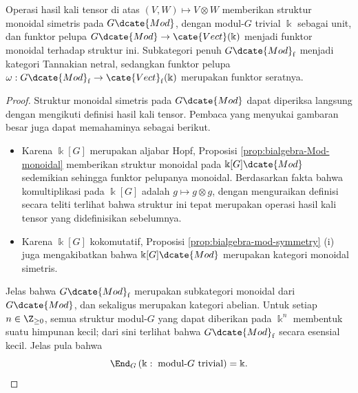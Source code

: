 \begin{proposition}\label{prop:RepG-Tannakian}
	Operasi hasil kali tensor di atas $(V, W) \mapsto V \otimes W$ memberikan struktur monoidal simetris pada $G\dcate{Mod}$, dengan modul-$G$ trivial $\Bbbk$ sebagai unit, dan funktor pelupa $G\dcate{Mod} \to \cate{Vect}(\Bbbk)$ menjadi funktor monoidal terhadap struktur ini. Subkategori penuh $G\dcate{Mod}_{\mathrm{f}}$ menjadi kategori Tannakian netral, sedangkan funktor pelupa $\omega: G\dcate{Mod}_{\mathrm{f}} \to \cate{Vect}_{\mathrm{f}}(\Bbbk)$ merupakan funktor seratnya.
\end{proposition}
\begin{proof}
	Struktur monoidal simetris pada $G\dcate{Mod}$ dapat diperiksa langsung
	dengan mengikuti definisi hasil kali tensor. Pembaca yang menyukai gambaran
	besar juga dapat memahaminya sebagai berikut.
	\begin{itemize}
		\item Karena $\Bbbk[G]$ merupakan aljabar Hopf, Proposisi \ref{prop:bialgebra-Mod-monoidal} memberikan struktur monoidal pada $\Bbbk[G]\dcate{Mod}$ sedemikian sehingga funktor pelupanya monoidal. Berdasarkan fakta bahwa komultiplikasi pada $\Bbbk[G]$ adalah $g \mapsto g \otimes g$, dengan menguraikan definisi secara teliti terlihat bahwa struktur ini tepat merupakan operasi hasil kali tensor yang didefinisikan sebelumnya.
		\item Karena $\Bbbk[G]$ kokomutatif, Proposisi \ref{prop:bialgebra-mod-symmetry} (i) juga mengakibatkan bahwa $\Bbbk[G]\dcate{Mod}$ merupakan kategori monoidal simetris.
	\end{itemize}
	
	Jelas bahwa $G\dcate{Mod}_{\mathrm{f}}$ merupakan subkategori monoidal dari $G\dcate{Mod}$, dan sekaligus merupakan kategori abelian. Untuk setiap $n \in \Z_{\geq 0}$, semua struktur modul-$G$ yang dapat diberikan pada $\Bbbk^n$ membentuk suatu himpunan kecil; dari sini terlihat bahwa $G\dcate{Mod}_{\mathrm{f}}$ secara esensial kecil. Jelas pula bahwa
	\[ \End_G\left(\Bbbk:\; \text{modul-$G$ trivial}\right) = \Bbbk. \]
	

\end{proof}
